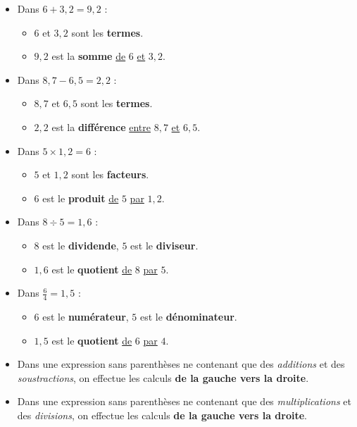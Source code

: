 \documentclass[../€Cours-complet/Cours-complet]{subfiles}
\begin{document}
\begin{exemple}
	\begin{itemize}
		\item Dans $6 + 3,2 = 9,2$ :
		      \begin{itemize}
			      \item $6$ et $3,2$ sont les \textbf{termes}.
			      \item $9,2$ est la \textbf{somme} \uline{de} $6$ \uline{et} $3,2$.
		      \end{itemize}
		\item Dans $8,7 - 6,5 = 2,2$ :
		      \begin{itemize}
			      \item $8,7$ et $6,5$ sont les \textbf{termes}.
			      \item $2,2$ est la \textbf{différence} \uline{entre} $8,7$ \uline{et} $6,5$.
		      \end{itemize}
		\item Dans $5 × 1,2 = 6$ :
		      \begin{itemize}
			      \item $5$ et $1,2$ sont les \textbf{facteurs}.
			      \item $6$ est le \textbf{produit} \uline{de} $5$ \uline{par} $1,2$.
		      \end{itemize}
		\item Dans $8 ÷ 5 = 1,6$ :
		      \begin{itemize}
			      \item $8$ est le \textbf{dividende}, $5$ est le \textbf{diviseur}.
			      \item $1,6$ est le \textbf{quotient} \uline{de} $8$ \uline{par} $5$.
		      \end{itemize}
		\item Dans $\frac{6}{4} = 1,5$ :
		      \begin{itemize}
			      \item $6$ est le \textbf{numérateur}, $5$ est le \textbf{dénominateur}.
			      \item $1,5$ est le \textbf{quotient} \uline{de} $6$ \uline{par} $4$.
		      \end{itemize}
	\end{itemize}
\end{exemple}

\begin{cours}
	\begin{itemize}
		\item Dans une expression sans parenthèses ne contenant que des \textit{additions} et des \textit{soustractions}, on effectue les calculs \textbf{de la gauche vers la droite}.
		\item Dans une expression sans parenthèses ne contenant que des \textit{multiplications} et des \textit{divisions}, on effectue les calculs \textbf{de la gauche vers la droite}.
	\end{itemize}
\end{cours}
\end{document}

